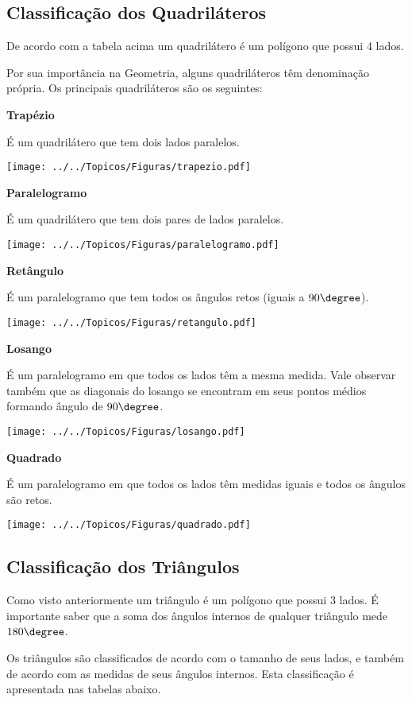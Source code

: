 \subsection{Classificação dos Quadriláteros}

De acordo com a tabela acima um quadrilátero é um polígono que possui 4 lados.

Por sua importância na Geometria, alguns quadriláteros têm denominação própria. Os principais quadriláteros são os seguintes:

\textbf{Trapézio}

É um quadrilátero que tem dois lados paralelos.

\texttt{[image: ../../Topicos/Figuras/trapezio.pdf]}


\textbf{Paralelogramo}

É um quadrilátero que tem dois pares de lados paralelos.

\texttt{[image: ../../Topicos/Figuras/paralelogramo.pdf]}

\newpage
\textbf{Retângulo}

É um paralelogramo que tem todos os ângulos retos (iguais a $90\degree$).

\texttt{[image: ../../Topicos/Figuras/retangulo.pdf]}


\textbf{Losango}

É um paralelogramo em que todos os lados têm a mesma medida. Vale observar também que as diagonais do losango se encontram em seus pontos médios formando ângulo de $90\degree$.

\texttt{[image: ../../Topicos/Figuras/losango.pdf]}


\textbf{Quadrado}

É um paralelogramo em que todos os lados têm medidas iguais e todos os ângulos são retos.

\texttt{[image: ../../Topicos/Figuras/quadrado.pdf]}


\subsection{Classificação dos Triângulos}

Como visto anteriormente um triângulo é um polígono que possui 3 lados. É importante saber que a soma dos ângulos internos de qualquer triângulo mede $180\degree$.

Os triângulos são classificados de acordo com o tamanho de seus lados, e também de acordo com as medidas de seus ângulos internos. Esta classificação é apresentada nas tabelas abaixo.

